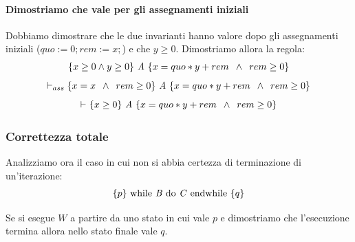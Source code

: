 \begin{esempio}
				      					\paragraph{Dimostriamo che vale per gli assegnamenti iniziali}
				      					Dobbiamo dimostrare che le due invarianti hanno valore dopo gli assegnamenti iniziali ($quo := 0; rem := x;$) e che $y\geq0$. 
				      					Dimostriamo allora la regola:
				      					\begin{align}
				      						\{x\geq 0 \land y\geq 0\}\mbox{ \textit{A} }\{x=quo*y + rem\,\,\,\land\,\,\, rem \geq 0\} 
				      						\label{ToCheck2}                                                                         
				      					\end{align}
				      					\[\vdash_{ass}\{x=x\,\,\,\land\,\,\, rem \geq 0\}\mbox{ \textit{A} }\{x=quo*y + rem\,\,\,\land\,\,\, rem \geq 0\}\]
				      					\[\vdash_{}\{x \geq 0\}\mbox{ \textit{A} }\{x=quo*y + rem\,\,\,\land\,\,\, rem \geq 0\}\]
				      				\end{esempio}
				      				\subsubsection{Correttezza totale}
				      				Analizziamo ora il caso in cui non si abbia certezza di terminazione di
				      				un'iterazione:
				      				\[\{p\}\mbox{ while \textit{B} do \textit{C} endwhile }\{q\}\]
				      								      				\begin{definizione}
				      					Se si esegue $W$  a partire da uno stato in cui vale $p$ e dimostriamo che l'esecuzione termina allora nello stato finale vale $q$.
				      				\end{definizione} \vspace{5mm} %

